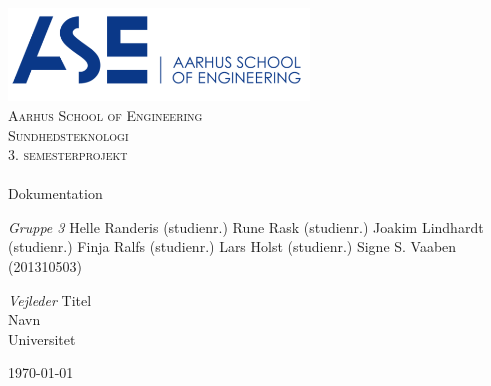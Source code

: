 \begin{titlingpage}
\begin{center}

~ \\[3cm]

\includegraphics[width=0.6\textwidth]{figurer/ASE}~\\[1cm]

\textsc{\LARGE Aarhus School of Engineering}\\[1.5cm]

\textsc{\Large Sundhedsteknologi}\\
\textsc{\Large 3. semesterprojekt}\\[0.5cm]

\noindent\makebox[\linewidth]{\rule{\textwidth}{0.4pt}}\\
[0.5cm]{\Huge Dokumentation}
\noindent\makebox[\linewidth]{\rule{\textwidth}{0.4pt}}

\end{center}

\textit{Gruppe 3} \newline
Helle Randeris (studienr.) \newline
Rune Rask (studienr.) \newline
Joakim Lindhardt (studienr.) \newline
Finja Ralfs (studienr.) \newline		 
Lars Holst (studienr.) \newline
Signe S. Vaaben (201310503) \newline 


\textit{Vejleder} \newline
Titel\\
Navn\\
Universitet


\vfill

\begin{center}
{\large \today}
\end{center}


\end{titlingpage}